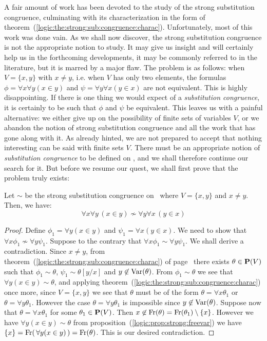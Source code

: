 A fair amount of work has been devoted to the study of the strong
substitution congruence, culminating with its characterization in
the form of theorem~(\ref{logic:the:strong:sub:congruence:charac}).
Unfortunately, most of this work was done vain. As we shall now
discover, the strong substitution congruence is not the appropriate
notion to study. It may give us insight and will certainly help us
in the forthcoming developments, it may be commonly referred to in
the literature, but it is marred by a major flaw. The problem is as
follows: when $V=\{x,y\}$ with $x\neq y$, i.e. when $V$ has only two
elements, the formulas $\phi=\forall x\forall y (x\in y)$ and
$\psi=\forall y\forall x(y\in x)$ are not equivalent. This is highly
disappointing. If there is one thing we would expect of a {\em
substitution congruence}, it is certainly to be such that $\phi$ and
$\psi$ be equivalent. This leaves us with a painful alternative: we
either give up on the possibility of finite sets of variables $V$,
or we abandon the notion of strong substitution congruence and all
the work that has gone along with it. As already hinted, we are not
prepared to accept that nothing interesting can be said with finite
sets $V$. There must be an appropriate notion of {\em substitution
congruence} to be defined on \pv, and we shall therefore continue
our search for it. But before we resume our quest, we shall first
prove that the problem truly exists:

\begin{prop}\label{logic:prop:counter:strong:1}
Let $\sim$ be the strong substitution congruence on \pv\ where
$V=\{x,y\}$ and $x\neq y$. Then, we have:
    \[
    \forall x\forall y\,(x\in y)\not\sim\forall y\forall x\,(y\in x)
    \]
\end{prop}
\begin{proof}
Define $\phi_{1}=\forall y(x\in y)$ and $\psi_{1}=\forall x(y\in
x)$. We need to show that $\forall x\phi_{1}\not\sim\forall
y\psi_{1}$. Suppose to the contrary that $\forall
x\phi_{1}\sim\forall y\psi_{1}$. We shall derive a contradiction.
Since $x\neq y$, from
theorem~(\ref{logic:the:strong:sub:congruence:charac}) of
page~\pageref{logic:the:strong:sub:congruence:charac} there exists
$\theta\in\mbox{${\bf P}(V)$}$ such that $\phi_{1}\sim\theta$,
$\psi_{1}\sim\theta[y/x]$ and $y\not\in\mbox{\rm Var}(\theta)$. From
$\phi_{1}\sim\theta$ we see that $\forall y(x\in y)\sim\theta$, and
applying theorem~(\ref{logic:the:strong:sub:congruence:charac}) once
more, since $V=\{x,y\}$ we see that $\theta$ must be of the form
$\theta=\forall x\theta_{1}$ or $\theta=\forall y\theta_{1}$.
However the case $\theta=\forall y\theta_{1}$ is impossible since
$y\not\in\mbox{\rm Var}(\theta)$. Suppose now that $\theta=\forall
x\theta_{1}$ for some $\theta_{1}\in\mbox{${\bf P}(V)$}$. Then
$x\not\in\mbox{\rm Fr}(\theta)=\mbox{\rm Fr}(\theta_{1})\setminus\{x\}$. However we
have $\forall y(x\in y)\sim\theta$ from
proposition~(\ref{logic:prop:strong:freevar}) we have
$\{x\}=\mbox{\rm Fr}(\,\forall y(x\in y)\,)=\mbox{\rm Fr}(\theta)$. This is our
desired contradiction.
\end{proof}

